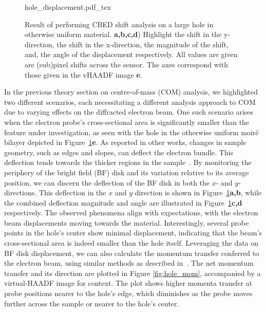 \begin{figure}
    \centering
    \def\svgwidth{.95\linewidth}
    {hole_displacement.pdf_tex}
    \caption{Result of performing CBED shift analysis on a large hole in otherwise uniform material. \textbf{a,b,c,d}) Highlight the shift in the y-direction, the shift in the x-direction, the magnitude of the shift, and, the angle of the displacement respectively. All values are given are (sub)pixel shifts across the sensor. The axes correspond with those given in the vHAADF image \textbf{e}.}
    \label{fig:hole_dis}
\end{figure}

In the previous theory section on centre-of-mass (COM) analysis, we highlighted two different scenarios, each necessitating a different analysis approach to COM due to varying effects on the diffracted electron beam.
%
One such scenario arises when the electron probe's cross-sectional area is significantly smaller than the feature under investigation, as seen with the hole in the otherwise uniform moiré bilayer depicted in Figure~\ref{fig:hole_dis}\textbf{e}. 
%
As reported in other works, changes in sample geometry, such as edges and slopes, can deflect the electron bundle. 
%
This deflection tends towards the thicker regions in the sample~\cite{ophusFourDimensionalScanningTransmission2019a,dekkers1974differential}. 
%
By monitoring the periphery of the bright field (BF) disk and its variation relative to its average position, we can discern the deflection of the BF disk in both the $x$- and $y$-directions. 
%
This deflection in the $x$ and $y$ direction is shown in Figure~\ref{fig:hole_dis}\textbf{a,b}, while the combined deflection magnitude and angle are illustrated in Figure~\ref{fig:hole_dis}\textbf{c,d} respectively. 
%
The observed phenomena align with expectations, with the electron beam displacements moving towards the material. 
%
Interestingly, several probe points in the hole's center show minimal displacement, indicating that the beam's cross-sectional area is indeed smaller than the hole itself.
%
Leveraging the data on  BF disk displacement, we can also calculate the momentum transfer conferred to the electron beam, using similar methods as described in~\cite{mullerAtomicElectricFields2014}. 
%
The net momentum transfer and its direction are plotted in Figure \ref{fig:hole_mom}, accompanied by a virtual-HAADF image for context. 
%
The plot shows higher momenta transfer at probe positions nearer to the hole's edge, which diminishes as the probe moves further across the sample or nearer to the hole's center.

